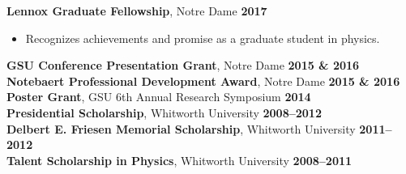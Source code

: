 \documentclass[margin]{res}
\begin{document}
\begin{resume}
{\bf Lennox Graduate Fellowship}, Notre Dame \hfill {\bf 2017}
\begin{itemize}  \itemsep -2pt %
     \item[] Recognizes achievements and promise as a graduate student in physics.
\end{itemize} \vspace{-12pt}
{\bf GSU Conference Presentation Grant}, Notre Dame  \hfill {\bf 2015 \& 2016}\\
{\bf Notebaert Professional Development Award}, Notre Dame \hfill {\bf 2015 \& 2016}\\
{\bf Poster Grant}, GSU 6th Annual Research Symposium \hfill {\bf 2014}\\
{\bf Presidential Scholarship}, Whitworth University \hfill {\bf2008--2012}\\
{\bf Delbert E. Friesen Memorial Scholarship}, Whitworth University \hfill {\bf2011--2012}\\
{\bf Talent Scholarship in Physics}, Whitworth University \hfill {\bf2008--2011}









\end{resume}
\end{document}

